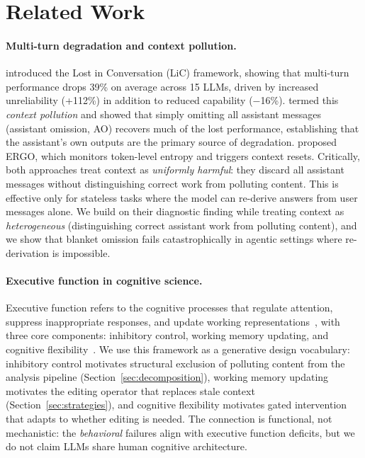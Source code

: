 \documentclass{article}
\begin{document}


\section{Related Work}
\label{sec:related}

\paragraph{Multi-turn degradation and context pollution.}
\citet{laban2025lost} introduced the Lost in Conversation (LiC) framework, showing that multi-turn performance drops 39\% on average across 15 LLMs, driven by increased unreliability (+112\%) in addition to reduced capability ($-$16\%). \citet{huang2026context} termed this \emph{context pollution} and showed that simply omitting all assistant messages (assistant omission, AO) recovers much of the lost performance, establishing that the assistant's own outputs are the primary source of degradation. \citet{khalid2025ergo} proposed ERGO, which monitors token-level entropy and triggers context resets. Critically, both approaches treat context as \emph{uniformly harmful}: they discard all assistant messages without distinguishing correct work from polluting content. This is effective only for stateless tasks where the model can re-derive answers from user messages alone. We build on their diagnostic finding while treating context as \emph{heterogeneous} (distinguishing correct assistant work from polluting content), and we show that blanket omission fails catastrophically in agentic settings where re-derivation is impossible.

\paragraph{Executive function in cognitive science.}
Executive function refers to the cognitive processes that regulate attention, suppress inappropriate responses, and update working representations~\citep{miyake2000unity}, with three core components: inhibitory control, working memory updating, and cognitive flexibility~\citep{diamond2013executive}. We use this framework as a generative design vocabulary: inhibitory control motivates structural exclusion of polluting content from the analysis pipeline (Section~\ref{sec:decomposition}), working memory updating motivates the editing operator that replaces stale context (Section~\ref{sec:strategies}), and cognitive flexibility motivates gated intervention that adapts to whether editing is needed. The connection is functional, not mechanistic: the \emph{behavioral} failures align with executive function deficits, but we do not claim LLMs share human cognitive architecture.
\end{document}
